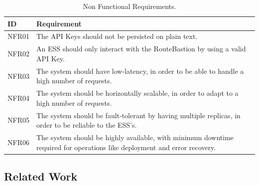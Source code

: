 \begin{table}
    \centering
    \caption{Non Functional Requirements.}
    \label{tab:req_nofunc}
    \begin{tabular}{p{.8cm}|p{6.5cm}}
        \hline
        ID & Requirement \\
        \hline
    
        {\small NFR01} & {\small The API Keys should not be persisted on plain text.} \\
        {\small NFR02} & {\small An ESS should only interact with the RouteBastion by using a valid API Key.} \\
        {\small NFR03} & {\small The system should have low-latency, in order to be able to handle a high number of requests.} \\
        {\small NFR04} & {\small The system should be horizontally scalable, in order to adapt to a high number of requests.} \\
        {\small NFR05} & {\small The system should be fault-tolerant by having multiple replicas, in order to be reliable to the ESS's.} \\
        {\small NFR06} & {\small The system should be highly available, with minimum downtime required for operations like deployment and error recovery.} \\
        \hline
    \end{tabular}
    
\end{table}


\subsection{Related Work}


